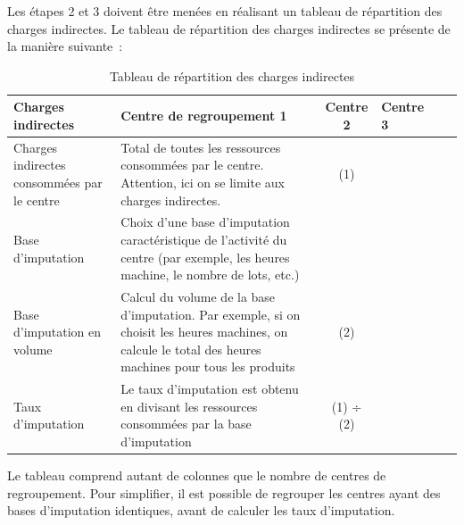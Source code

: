 \documentclass[oneside]{kaobook}
\begin{document}
Les étapes 2 et 3 doivent être menées en réalisant un tableau de répartition des charges indirectes. Le tableau de répartition des charges indirectes se présente de la manière suivante :
\clearpage
\begin{table}[htbp]
\caption{Tableau de répartition des charges indirectes}
\centering
\footnotesize
\begin{tabular}{p{3cm} p{5cm} cp{1cm} cp{1cm}}
Charges indirectes & Centre de regroupement 1 & Centre 2 & Centre 3\\
\hline
Charges indirectes consommées par le centre & Total de toutes les ressources consommées par le centre. Attention, ici on se limite aux charges indirectes. & (1) & \\
Base d'imputation & Choix d'une base d'imputation caractéristique de l'activité du centre (par exemple, les heures machine, le nombre de lots, etc.) &  & \\
Base d'imputation en volume & Calcul du volume de la base d'imputation. Par exemple, si on choisit les heures machines, on calcule le total des heures machines pour tous les produits & (2) & \\
Taux d'imputation & Le taux d'imputation est obtenu en divisant les ressources consommées par la base d'imputation & (1) ÷ (2) & \\
\end{tabular}
\end{table}

Le tableau comprend autant de colonnes que le nombre de centres de regroupement.  Pour simplifier, il est possible de regrouper les centres ayant des bases d'imputation identiques, avant de calculer les taux d'imputation.
\end{document}
